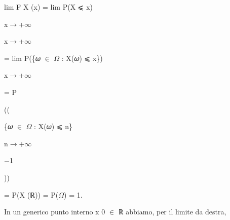 \documentclass[a4paper,portrait,12pt]{article}
\begin{document}
\begin{flushleft}
lim F X (x) = lim P(X ⩽ x)
\end{flushleft}





\begin{flushleft}
x$\rightarrow$+$\infty$
\end{flushleft}





\begin{flushleft}
x$\rightarrow$+$\infty$
\end{flushleft}





\begin{flushleft}
= lim P(\{𝜔 $\in$ $\Omega$ : X(𝜔) ⩽ x\})
\end{flushleft}


\begin{flushleft}
x$\rightarrow$+$\infty$
\end{flushleft}





\begin{flushleft}
= P
\end{flushleft}





((





\begin{flushleft}
\{𝜔 $\in$ $\Omega$ : X(𝜔) ⩽ n\}
\end{flushleft}





\begin{flushleft}
n$\rightarrow$+$\infty$
\end{flushleft}


$-$1





))





\begin{flushleft}
= P(X (ℝ)) = P($\Omega$) = 1.
\end{flushleft}


\begin{flushleft}
In un generico punto interno x 0 $\in$ ℝ abbiamo, per il limite da destra,
\end{flushleft}
\end{document}

